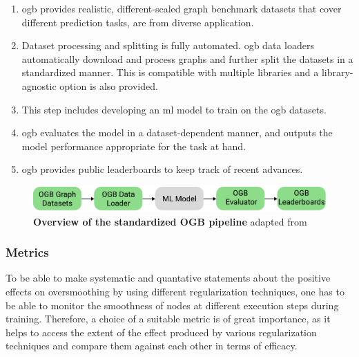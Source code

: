 \begin{enumerate}
    \item \Ac{ogb} provides realistic, different-scaled graph benchmark datasets that cover different prediction tasks, are from diverse application.
    \item Dataset processing and splitting is fully automated. \Ac{ogb} data loaders automatically download and process graphs and further split the datasets in a standardized manner. This is compatible with multiple libraries and a library-agnostic option is also provided.
    \item This step includes developing an \ac{ml} model to train on the ogb datasets.
    \item  \Ac{ogb} evaluates the model in a dataset-dependent manner, and outputs the model performance appropriate for the task at hand.
    \item \Ac{ogb} provides public leaderboards to keep track of recent advances.
\end{enumerate}

\begin{figure}[H]
    \centering
    \includegraphics[width= 0.90\linewidth]{gfx/implementation/OGB_pipeline}
    \caption{\textbf{Overview of the standardized OGB pipeline} adapted from \cite{Hu2020}}\label{fig:implement:pipeline}
\end{figure}





\subsubsection{Metrics}
\label{sec:implement:setup:choice:metrics}
To be able to make systematic and quantative statements about the positive effects on oversmoothing by using different regularization techniques, one has to be able to monitor the smoothness of nodes at different execution steps during training. Therefore, a choice of a suitable metric is of great importance, as it helps to access the extent of the effect produced by various regularization techniques and compare them against each other in terms of efficacy.

